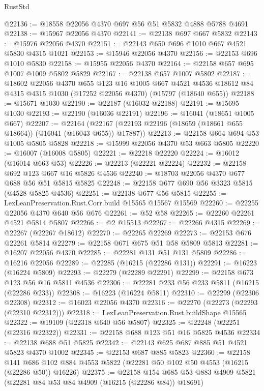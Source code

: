 \begin{lexlean}{RustStd}
\begin{coremodule}
@22136 := @18558 @22056 @4370 @697 @56 @51 @5832 @4888 @5788 @4691
@22138 := @15967 @22056 @4370
@22141 := @22138 @697 @667 @5832
@22143 := @15976 @22056 @4370
@22151 := @22143 @650 @696 @1010 @667 @4521 @5830 @4315 @1021
@22153 := @15946 @22056 @4370
@22156 := @22153 @696 @1010 @5830
@22158 := @15955 @22056 @4370
@22164 := @22158 @657 @695 @1007 @1009 @5802 @5829
@22167 := @22138 @657 @1007 @5802
@22187 := @18602
    @22056
    @4370
    @655
    @123
    @16
    @1005
    @667
    @4521
    @4536
    @18612
    @84
    @4315
    @4315
    @1030
    (@17252 @22056 @4370)
    (@15797 (@18640 @655))
@22188 := @15671 @1030
@22190 := @22187 (@16032 @22188)
@22191 := @15695 @1030
@22193 := @22190 (@16036 @22191)
@22196 := @16041 (@18651 @1005 @667)
@22207 := @22164
    (@22167 (@22193 @22196 (@18659 (@18661 @655 @18664)) (@16041 (@16043 @655)) @17887))
@22213 := @22158 @664 @694 @53 @1005 @5805 @5828
@22218 := @15999 @22056 @4370 @53 @663 @5805
@22220 := @16007 (@16008 @5805)
@22221 := @22218 @22220
@22224 := @16012 (@16014 @663 @53)
@22226 := @22213 (@22221 @22224)
@22232 := @22158 @692 @123 @667 @16 @5826 @4536
@22240 := @18703 @22056 @4370 @677 @688 @56 @51 @5815 @5825
@22248 := @22158 @677 @690 @56 @3323 @5815 (@4528 @5825 @4536)
@22251 := @22138 @677 @56 @5815
@22255 := LexLeanPreservation.Rust.Corr.build @15565 @15567 @15569
@22260 := @22255 @22056 @4370 @640 @56 @676
@22261 := @52 @58
@22265 := @22260 @22261 @4521 @5814 @5807
@22266 := @2 @15513
@22267 := @22266 @4315
@22269 := @22267 (@22267 @18612)
@22270 := @22265 @22269
@22273 := @22153 @676 @22261 @5814
@22279 := @22158 @671 @675 @51 @58 @5809 @5813
@22281 := @16207 @22056 @4370
@22285 := @22281 @131 @51 @131 @5809
@22286 := @16216 @22056
@22289 := @22285 (@16215 (@22286 @131))
@22291 := @16223 (@16224 @5809)
@22293 := @22279 (@22289 @22291)
@22299 := @22158 @673 @123 @56 @16 @5811 @4536
@22306 := @22281 @233 @56 @233 @5811 (@16215 (@22286 @233))
@22308 := @16223 (@16224 @5811)
@22310 := @22299 (@22306 @22308)
@22312 := @16023 @22056 @4370
@22316 := @22270 (@22273 (@22293 (@22310 @22312)))
@22318 := LexLeanPreservation.Rust.buildShape @15565
@22322 := @19109 (@22318 @640 @56 @5807)
@22325 := @22248 (@22251 (@22316 @22322))
@22331 := @22158 @688 @123 @51 @16 @5825 @4536
@22334 := @22138 @688 @51 @5825
@22342 := @22143 @625 @687 @885 @51 @4521 @5823 @4370 @1002
@22345 := @22153 @687 @885 @5823
@22360 := @22158
    @141
    @686
    @102
    @884
    @4553
    @5822
    (@22281 @50 @102 @50 @4553 (@16215 (@22286 @50)) @16226)
@22375 := @22158
    @154
    @685
    @53
    @883
    @4909
    @5821
    (@22281 @84 @53 @84 @4909 (@16215 (@22286 @84)) @18691)

\end{coremodule}
\end{lexlean}
